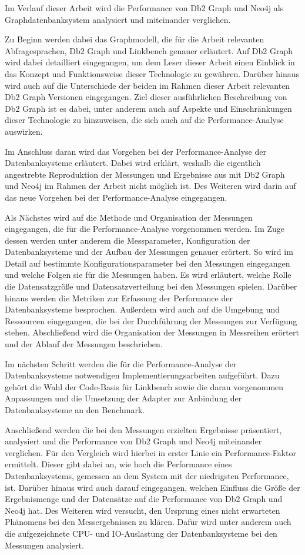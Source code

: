 Im Verlauf dieser Arbeit wird die Performance von Db2 Graph und Neo4j als Graphdatenbanksystem analysiert und miteinander verglichen. 

Zu Beginn werden dabei das Graphmodell, die für die Arbeit relevanten Abfragesprachen, Db2 Graph und Linkbench genauer erläutert. Auf Db2 Graph wird dabei detailliert eingegangen, um dem Leser dieser Arbeit einen Einblick in das Konzept und Funktionsweise dieser Technologie zu gewähren. Darüber hinaus wird auch auf die Unterschiede der beiden im Rahmen dieser Arbeit relevanten Db2 Graph Versionen eingegangen. Ziel dieser ausführlichen Beschreibung von Db2 Graph ist es dabei, unter anderem auch auf Aspekte und Einschränkungen dieser Technologie zu hinzuweisen, die sich auch auf die Performance-Analyse auswirken.

Im Anschluss daran wird das Vorgehen bei der Performance-Analyse der Datenbanksysteme erläutert. Dabei wird erklärt, weshalb die eigentlich angestrebte Reproduktion der Messungen und Ergebnisse aus \cite{sigmod_tian} mit Db2 Graph und Neo4j im Rahmen der Arbeit nicht möglich ist. Des Weiteren wird darin auf das neue Vorgehen bei der Performance-Analyse eingegangen. 

Als Nächstes wird auf die Methode und Organisation der Messungen eingegangen, die für die Performance-Analyse vorgenommen werden. Im Zuge dessen werden unter anderem die Messparameter, Konfiguration der Datenbanksysteme und der Aufbau der Messungen genauer erörtert. So wird im Detail auf bestimmte Konfigurationsparameter bei den Messungen eingegangen und welche Folgen sie für die Messungen haben. Es wird erläutert, welche Rolle die Datensatzgröße und Datensatzverteilung bei den Messungen spielen. Darüber hinaus werden die Metriken zur Erfassung der Performance der Datenbanksysteme besprochen. Außerdem wird auch auf die Umgebung und Ressourcen eingegangen, die bei der Durchführung der Messungen zur Verfügung stehen. Abschließend wird die Organisation der Messungen in Messreihen erörtert und der Ablauf der Messungen beschrieben.  

Im nächsten Schritt werden die für die Performance-Analyse der Datenbanksysteme notwendigen Implementierungsarbeiten aufgeführt. Dazu gehört die Wahl der Code-Basis für Linkbench sowie die daran vorgenommen Anpassungen und die Umsetzung der Adapter zur Anbindung der Datenbanksysteme an den Benchmark. 

Anschließend werden die bei den Messungen erzielten Ergebnisse präsentiert, analysiert und die Performance von Db2 Graph und Neo4j miteinander verglichen. Für den Vergleich wird hierbei in erster Linie ein Performance-Faktor ermittelt. Dieser gibt dabei an, wie hoch die Performance eines Datenbanksystems, gemessen an dem System mit der niedrigsten Performance, ist. Darüber hinaus wird auch darauf eingegangen, welchen Einfluss die Größe der Ergebnismenge und der Datensätze auf die Performance von Db2 Graph und Neo4j hat. Des Weiteren wird versucht, den Ursprung eines nicht erwarteten Phänomens bei den Messergebnissen zu klären. Dafür wird unter anderem auch die aufgezeichnete CPU- und IO-Auslastung der Datenbanksysteme bei den Messungen analysiert.